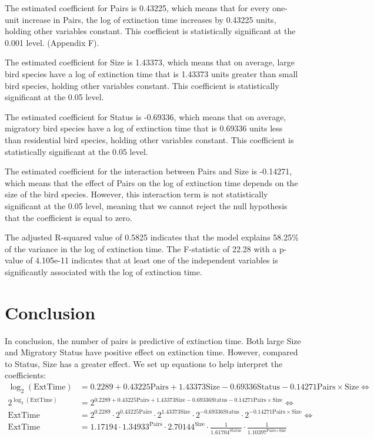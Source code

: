 \documentclass[a4paper, 12pt]{article}
\begin{document}
\begin{spacing}{1.5}
The estimated coefficient for Pairs is 0.43225, which means that for every one-unit increase in Pairs, the log of extinction time increases by 0.43225 units, holding other variables constant. This coefficient is statistically significant at the 0.001 level. (Appendix F).

The estimated coefficient for Size is 1.43373, which means that on average, large bird species have a log of extinction time that is 1.43373 units greater than small bird species, holding other variables constant. This coefficient is statistically significant at the 0.05 level.

The estimated coefficient for Status is -0.69336, which means that on average, migratory bird species have a log of extinction time that is 0.69336 units less than residential bird species, holding other variables constant. This coefficient is statistically significant at the 0.05 level.

The estimated coefficient for the interaction between Pairs and Size is -0.14271, which means that the effect of Pairs on the log of extinction time depends on the size of the bird species. However, this interaction term is not statistically significant at the 0.05 level, meaning that we cannot reject the null hypothesis that the coefficient is equal to zero.

The adjusted R-squared value of 0.5825 indicates that the model explains 58.25\% of the variance in the log of extinction time. The F-statistic of 22.28 with a p-value of 4.105e-11 indicates that at least one of the independent variables is significantly associated with the log of extinction time.

\section{Conclusion}

In conclusion, the number of pairs is predictive of extinction time. Both large Size and Migratory Status have positive effect on extinction time. However, compared to Status, Size has a greater effect. We set up equations to help interpret the coefficients:  
$$
\begin{aligned}
\log_2\left(\text{ExtTime}\right)&=0.2289+0.43225\text{Pairs}+1.43373\text{Size}-0.69336\text{Status}-0.14271\text{Pairs}\times\text{Size} \Leftrightarrow \\
2^{\log_2(\text{ExtTime})}&=2^{0.2289+0.43225\text{Pairs}+1.43373\text{Size}-0.69336\text{Status}-0.14271\text{Pairs}\times\text{Size}} \Leftrightarrow \\
\text{ExtTime}&=2^{0.2289}\cdot2^{0.43225\text{Pairs}}\cdot2^{1.43373\text{Size}}\cdot2^{-0.69336\text{Status}}\cdot2^{-0.14271\text{Pairs}\times\text{Size}} \Leftrightarrow \\
\text{ExtTime}&=1.17194\cdot1.34933^\text{Pairs}\cdot2.70144^\text{Size}\cdot\frac{1}{1.61704^\text{Status}}\cdot\frac{1}{1.10397^{\text{Pairs}\times\text{Size}}} 
\end{aligned}
$$
  

\end{spacing}
\end{document}
